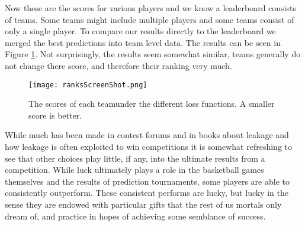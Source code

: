 Now these are the scores for various players and we know a leaderboard consists of teams. Some teams might include multiple players and some teams consist of only a single player. To compare our results directly to the leaderboard we merged the best predictions into team level data. The results can be seen in Figure \ref{fig:team_rank_plot}. 
Not surprisingly, the results seem somewhat similar, teams generally do not change there score, and therefore their ranking very much. 

 \begin{figure}[H]
\centering
\texttt{[image: ranksScreenShot.png]}
\caption{The scores of each teamunder the different loss functions. A smaller score is better.  }
\label{fig:team_rank_plot}
\end{figure}


While much has been made in contest forums and in books \cite{schutt2013doing} about leakage and how leakage is often exploited to win competitions it is somewhat refreshing to see that other choices play little, if any, into the ultimate results from a competition. While luck ultimately plays a role in the basketball games themselves and the results of prediction tournaments, some players are able to consistently outperform. These consistent performs are lucky, but lucky in the sense they are endowed with particular gifts that the rest of us mortals only dream of, and practice in hopes of achieving some semblance of success.  